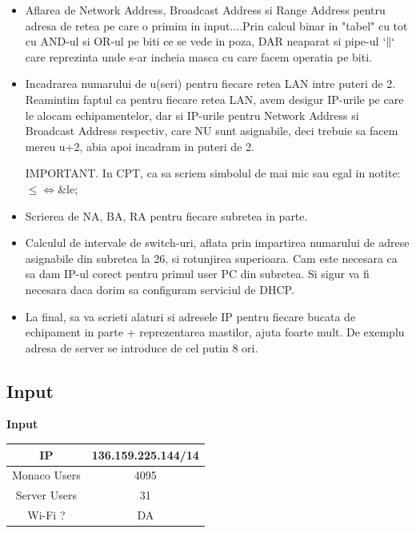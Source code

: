 \documentclass{article}
\begin{document}
\begin{itemize}
    \item[Pas 1] Aflarea de Network Address, Broadcast Address si Range Address pentru adresa de retea pe care o primim in input....Prin calcul binar in "tabel" cu tot cu AND-ul si OR-ul pe biti ce se vede in poza, DAR neaparat si pipe-ul $`\|` $ care reprezinta unde s-ar incheia masca cu care facem operatia pe biti.
    \item[Pas 2] Incadrarea numarului de u(seri) pentru fiecare retea LAN intre puteri de 2. Reamintim faptul ca pentru fiecare retea LAN, avem desigur IP-urile pe care le alocam echipamentelor, dar si IP-urile pentru Network Address si Broadcast Address respectiv, care NU sunt asignabile, deci trebuie sa facem mereu u+2, abia apoi incadram in puteri de 2.

    IMPORTANT. In CPT, ca sa scriem simbolul de mai mic sau egal in notite: $\leq \Leftrightarrow \&$le;
    
    \item[Pas 3] Scrierea de NA, BA, RA pentru fiecare subretea in parte.
    
    \item[Pas 4*] Calculul de intervale de switch-uri, aflata prin impartirea numarului de adrese asignabile din subretea la 26, si rotunjirea superioara. Cam este necesara ca sa dam IP-ul corect pentru primul user PC din subretea. Si sigur va fi necesara daca dorim sa configuram serviciul de DHCP.
    \item[Sfat]  La final, sa va scrieti alaturi si adresele IP pentru fiecare bucata de echipament in parte + reprezentarea mastilor, ajuta foarte mult. De exemplu adresa de server se introduce de cel putin 8 ori.
\end{itemize}


\subsection{Input}
\begin{center}
    \textbf{Input}   
    
    \begin{tabular}{|c|c|}\hline
         IP & 136.159.225.144/14 \\
         \hline \hline
         Monaco Users& 4095 \\ \hline
         Server Users& 31 \\\hline
         Wi-Fi ? & DA \\\hline
    \end{tabular}
\end{center}
\end{document}
